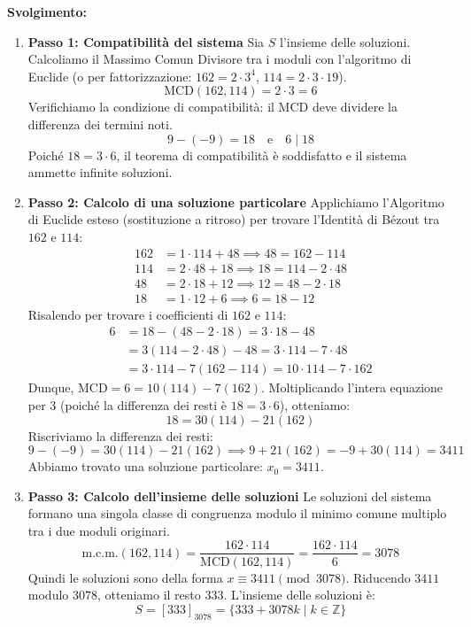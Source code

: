 \documentclass[12pt, a4paper]{article}
\begin{document}
\textbf{Svolgimento:}
\begin{enumerate}
    \item \textbf{Passo 1: Compatibilità del sistema}
    Sia $S$ l'insieme delle soluzioni. Calcoliamo il Massimo Comun Divisore tra i moduli con l'algoritmo di Euclide (o per fattorizzazione: $162 = 2 \cdot 3^4$, $114 = 2 \cdot 3 \cdot 19$).
    \[ \text{MCD}(162, 114) = 2 \cdot 3 = 6 \]
    Verifichiamo la condizione di compatibilità: il MCD deve dividere la differenza dei termini noti.
    \[ 9 - (-9) = 18 \quad \text{e} \quad 6 \mid 18 \]
    Poiché $18 = 3 \cdot 6$, il teorema di compatibilità è soddisfatto e il sistema ammette infinite soluzioni.

    \item \textbf{Passo 2: Calcolo di una soluzione particolare}
    Applichiamo l'Algoritmo di Euclide esteso (sostituzione a ritroso) per trovare l'Identità di Bézout tra $162$ e $114$:
    \begin{align*}
        162 &= 1 \cdot 114 + 48 \implies 48 = 162 - 114 \\
        114 &= 2 \cdot 48 + 18 \implies 18 = 114 - 2 \cdot 48 \\
        48 &= 2 \cdot 18 + 12 \implies 12 = 48 - 2 \cdot 18 \\
        18 &= 1 \cdot 12 + 6 \implies 6 = 18 - 12
    \end{align*}
    Risalendo per trovare i coefficienti di $162$ e $114$:
    \begin{align*}
        6 &= 18 - (48 - 2 \cdot 18) = 3 \cdot 18 - 48 \\
        &= 3(114 - 2 \cdot 48) - 48 = 3 \cdot 114 - 7 \cdot 48 \\
        &= 3 \cdot 114 - 7(162 - 114) = 10 \cdot 114 - 7 \cdot 162
    \end{align*}
    Dunque, $\text{MCD} = 6 = 10(114) - 7(162)$.
    Moltiplicando l'intera equazione per $3$ (poiché la differenza dei resti è $18 = 3 \cdot 6$), otteniamo:
    \[ 18 = 30(114) - 21(162) \]
    Riscriviamo la differenza dei resti:
    \[ 9 - (-9) = 30(114) - 21(162) \implies 9 + 21(162) = -9 + 30(114) = 3411 \]
    Abbiamo trovato una soluzione particolare: $x_0 = 3411$.

    \item \textbf{Passo 3: Calcolo dell'insieme delle soluzioni}
    Le soluzioni del sistema formano una singola classe di congruenza modulo il minimo comune multiplo tra i due moduli originari.
    \[ \text{m.c.m.}(162, 114) = \frac{162 \cdot 114}{\text{MCD}(162, 114)} = \frac{162 \cdot 114}{6} = 3078 \]
    Quindi le soluzioni sono della forma $x \equiv 3411 \pmod{3078}$.
    Riducendo $3411$ modulo $3078$, otteniamo il resto $333$. L'insieme delle soluzioni è:
    \[ S = [333]_{3078} = \{ 333 + 3078k \mid k \in \mathbb{Z} \} \]


\end{enumerate}
\end{document}

